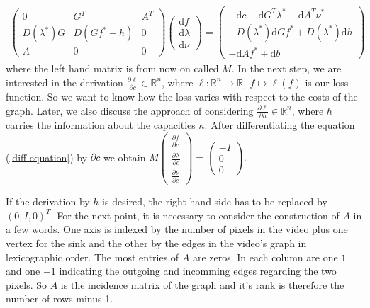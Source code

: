 \documentclass{article}
\begin{document}
\begin{align}
\begin{pmatrix} 0 & G^T & A^T \\ D(\lambda^*) G & D(Gf^* -h) & 0 \\ A & 0 & 0 \end{pmatrix}
\begin{pmatrix} \mathrm{d} f \\ \mathrm{d} \lambda \\ \mathrm{d} \nu \end{pmatrix} = 
\begin{pmatrix} -\mathrm{d}c - \mathrm{d}G^T \lambda^* -\mathrm{d}A^T\nu^* \\ 
-D(\lambda^*)\mathrm d G f^* + D(\lambda^*)\mathrm d h \\
-\mathrm d A f^* + \mathrm d b \end{pmatrix} \label{diff equation}
\end{align}
where the left hand matrix is from now on called $M$.
In the next step, we are interested in the derivation $\frac{\partial \ell}{\partial c}\in \mathbb R ^n$, where $\ell: \mathbb{R}^n \rightarrow \mathbb R,~f\mapsto \ell(f) $ is our loss function. So we want to know how the loss varies with respect to the costs of the graph. Later, we also discuss the approach of considering $\frac{\partial \ell}{\partial h}\in \mathbb R^n$, where $h$ carries the information about the capacities $\kappa$. After differentiating the equation (\ref*{diff equation}) by $\partial c$ we obtain
$M \begin{pmatrix} \frac{\partial f}{\partial c} \\[4pt] \frac{\partial\lambda}{\partial c} \\[4pt] \frac{\partial \nu}{\partial c} \end{pmatrix}
= 
\begin{pmatrix} -I \\ 0 \\ 0 \end{pmatrix}.$

If the derivation by $h$ is desired, the right hand side has to be replaced by $(0, I, 0)^T$.
For the next point, it is necessary to consider the construction of $A$ in a few words. One axis is indexed by the number of pixels in the video plus one vertex for the sink and the other by the edges in the video's graph in lexicographic order. The most entries of $A$ are zeros. In each column are one $1$ and one $-1$ indicating the outgoing and incomming edges regarding the two pixels. So $A$ is the incidence matrix of the graph and it's rank is therefore the number of rows minus 1.
\end{document}
